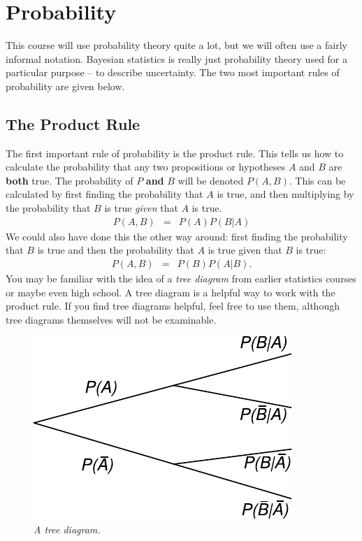 \chapter{Probability}
This course will use probability theory quite a lot, but we will often use
a fairly informal notation. Bayesian
statistics is really just probability theory used for a particular purpose --
to describe uncertainty. The two most important rules of probability are given below.

\section{The Product Rule}
The first important rule of probability is the
product rule. This tells us how to calculate the probability that any two
propositions or hypotheses $A$ and $B$ are {\bf both} true.
The probability of $P$ {\bf and}
$B$ will be denoted $P(A, B)$. This can be calculated by first finding the
probability that $A$ is true, and then multiplying by the probability that $B$
is true {\it given} that $A$ is true.
\begin{eqnarray}
P(A, B) &=& P(A)P(B|A)\label{product1}
\end{eqnarray}
We could also have done this the other way around: first finding the
probability that $B$ is true and then the probability that $A$ is true given
that $B$ is true:
\begin{eqnarray}
P(A, B) &=& P(B)P(A|B).\label{product2}
\end{eqnarray}
You may be familiar with the idea of a {\it tree diagram} from earlier
statistics courses or maybe even high school. A tree diagram is a helpful way
to work with the product rule. If you find tree diagrams helpful, feel free to
use them, although tree diagrams themselves will not be examinable.

\begin{figure}[ht!]
\begin{center}
\includegraphics[scale=0.9]{Figures/tree_diagram.pdf}
\caption{\it A tree diagram.}
\end{center}
\end{figure}


